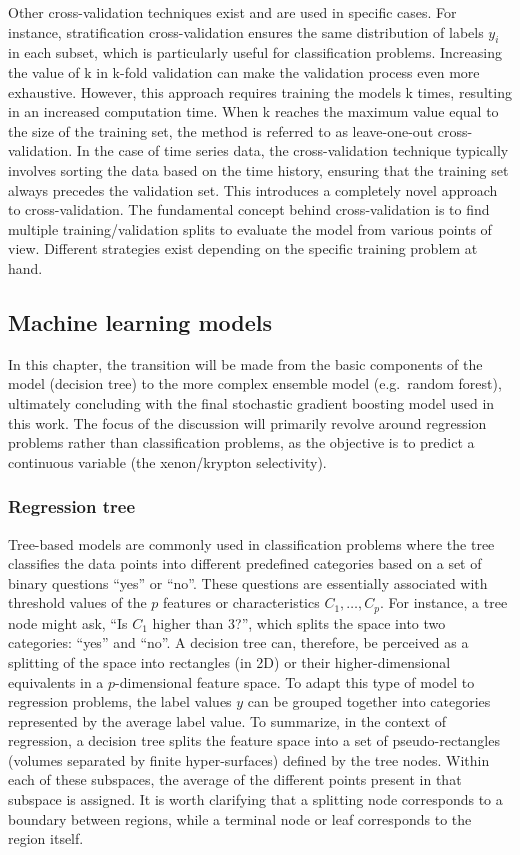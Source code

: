 \documentclass[main]{subfiles}
\begin{document}
Other cross-validation techniques exist and are used in specific cases. For instance, stratification cross-validation ensures the same distribution of labels $y_i$ in each subset, which is particularly useful for classification problems. Increasing the value of k in  k-fold validation can make the validation process even more exhaustive. However, this approach requires training the models k times, resulting in an increased computation time. When k reaches the maximum value equal to the size of the training set, the method is referred to as leave-one-out cross-validation. In the case of time series data, the cross-validation technique typically involves sorting the data based on the time history, ensuring that the training set always precedes the validation set. This introduces a completely novel approach to cross-validation. The fundamental concept behind cross-validation is to find multiple training/validation splits to evaluate the model from various points of view. Different strategies exist depending on the specific training problem at hand.

\subsection{Machine learning models}\label{sct:model}

In this chapter, the transition will be made from the basic components of the model (decision tree) to the more complex ensemble model (e.g.\ random forest), ultimately concluding with the final stochastic gradient boosting model used in this work. The focus of the discussion will primarily revolve around regression problems rather than classification problems, as the objective is to predict a continuous variable (the xenon/krypton selectivity).

\subsubsection{Regression tree}

Tree-based models are commonly used in classification problems where the tree classifies the data points into different predefined categories based on a set of binary questions ``yes'' or ``no''. These questions are essentially associated with threshold values of the $p$ features or characteristics $C_1,\ldots,C_p$. For instance, a tree node might ask, ``Is $C_1$ higher than $3$?'', which splits the space into two categories: ``yes'' and ``no''. A decision tree can, therefore, be perceived as a splitting of the space into rectangles (in 2D) or their higher-dimensional equivalents in a $p$-dimensional feature space. To adapt this type of model to regression problems, the label values $y$ can be grouped together into categories represented by the average label value. To summarize, in the context of regression, a decision tree splits the feature space into a set of pseudo-rectangles (volumes separated by finite hyper-surfaces) defined by the tree nodes. Within each of these subspaces, the average of the different points present in that subspace is assigned. It is worth clarifying that a splitting node corresponds to a boundary between regions, while a terminal node or leaf corresponds to the region itself.
\end{document}
